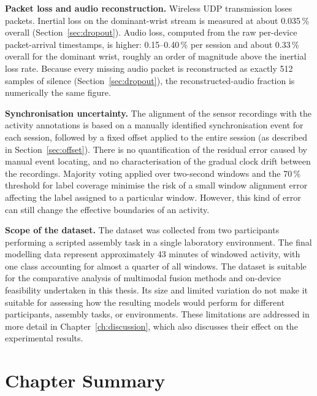 \textbf{Packet loss and audio reconstruction.} Wireless UDP transmission loses
packets. Inertial loss on the dominant-wrist stream is measured at about
0.035\,\% overall (Section~\ref{sec:dropout}). Audio loss, computed from the raw
per-device packet-arrival timestamps, is higher: 0.15--0.40\,\% per session and
about 0.33\,\% overall for the dominant wrist, roughly an order of magnitude
above the inertial loss rate. Because every missing audio packet is
reconstructed as exactly 512 samples of silence (Section~\ref{sec:dropout}), the
reconstructed-audio fraction is numerically the same figure.

\textbf{Synchronisation uncertainty.} The alignment of the sensor recordings
with the activity annotations is based on a manually identified synchronisation
event for each session, followed by a fixed offset applied to the entire
session (as described in Section~\ref{sec:offset}). There is no quantification
of the residual error caused by manual event locating, and no characterisation
of the gradual clock drift between the recordings. Majority voting applied over
two-second windows and the 70\,\% threshold for label coverage minimise the
risk of a small window alignment error affecting the label assigned to a
particular window. However, this kind of error can still change the effective
boundaries of an activity.

\textbf{Scope of the dataset.} The dataset was collected from two participants
performing a scripted assembly task in a single laboratory environment. The
final modelling data represent approximately 43 minutes of windowed activity,
with one class accounting for almost a quarter of all windows. The dataset
is suitable for the comparative analysis of multimodal fusion methods and
on-device feasibility undertaken in this thesis. Its size and limited variation
do not make it suitable for assessing how the resulting models would perform
for different participants, assembly tasks, or environments. These limitations
are addressed in more detail in Chapter~\ref{ch:discussion}, which also
discusses their effect on the experimental results.

\section{Chapter Summary}
\label{sec:ch3-summary}

